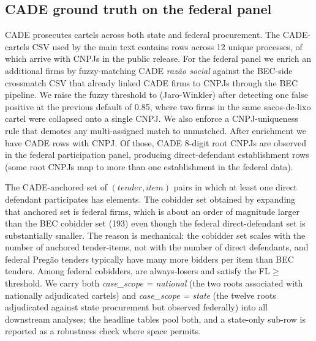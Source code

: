 \subsection{CADE ground truth on the federal panel}
\label{app:comprasnet_linkage}

CADE prosecutes cartels across both state and federal procurement.
The CADE-cartels CSV used by the main text contains
\valFedCadeRows{} rows across 12 unique processes, of which
\valFedCadeWithCNPJ{} arrive with CNPJs in the public release.
For the federal panel we enrich an additional \valFedCadeEnrichedBEC{}
firms by fuzzy-matching CADE \emph{razão social} against the
BEC-side crossmatch CSV that already linked CADE firms to CNPJs
through the BEC pipeline. We raise the fuzzy threshold to
\valFedFuzzyThreshold{} (Jaro-Winkler) after detecting one false
positive at the previous default of 0.85, where two firms in the
same sacos-de-lixo cartel were collapsed onto a single CNPJ. We
also enforce a CNPJ-uniqueness rule that demotes any
multi-assigned match to unmatched. After enrichment we have
\valFedCadeEnrichedTotal{} CADE rows with CNPJ. Of those,
\valFedRaizesMatched{} CADE 8-digit root CNPJs are observed in
the federal participation panel, producing \valFedDirects{}
direct-defendant establishment rows (some root CNPJs map to more
than one establishment in the federal data).

The CADE-anchored set of $(\textit{tender}, \textit{item})$ pairs
in which at least one direct defendant participates has
\valFedAnchoredTenders{} elements. The cobidder set obtained by
expanding that anchored set is \valFedCobidders{} federal firms,
which is about an order of magnitude larger than the BEC cobidder
set (193) even though the federal direct-defendant set is
substantially smaller. The reason is mechanical: the cobidder set
scales with the number of anchored tender-items, not with the
number of direct defendants, and federal Pregão tenders typically
have many more bidders per item than BEC tenders. Among federal
cobidders, \valFedALcobidders{} are always-losers and
\valFedFLcobidders{} satisfy the FL$\geq$\valFedFLthreshold{}
threshold. We carry both \emph{case\_scope = national} (the two
roots associated with nationally adjudicated cartels) and
\emph{case\_scope = state} (the twelve roots adjudicated against
state procurement but observed federally) into all downstream
analyses; the headline tables pool both, and a state-only sub-row
is reported as a robustness check where space permits.

